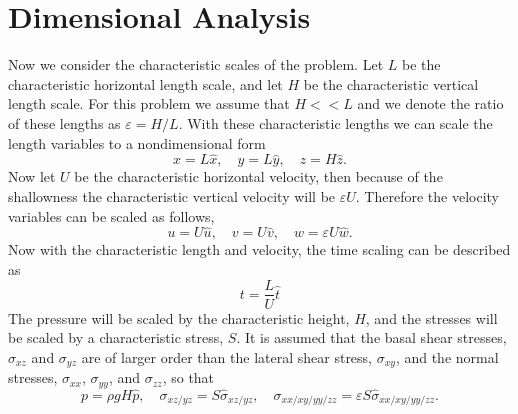 \documentclass[oneside]{article}
\begin{document}
  \section{Dimensional Analysis}
    Now we consider the characteristic scales of the problem.
    Let \(L\) be the characteristic horizontal length scale, and let \(H\) be the
    characteristic vertical length scale.
    For this problem we assume that \(H << L\) and we denote the ratio of these
    lengths as \(\varepsilon = H/L\).
    With these characteristic lengths we can scale the length variables to a
    nondimensional form
    \begin{equation}
      x = L\hat{x}, \quad y = L\hat{y}, \quad z = H\hat{z}.
    \end{equation}
    Now let \(U\) be the characteristic horizontal velocity, then because of the
    shallowness the characteristic vertical velocity will be \(\varepsilon U\).
    Therefore the velocity variables can be scaled as follows,
    \begin{equation}
      u = U\hat{u}, \quad v = U\hat{v}, \quad w = \varepsilon U \hat{w}.
    \end{equation}
    Now with the characteristic length and velocity, the time scaling can be described
    as
    \begin{equation}
      t = \frac{L}{U}\hat{t}
    \end{equation}
    The pressure will be scaled by the characteristic height, \(H\), and the stresses
    will be scaled by a characteristic stress, \(S\).
    It is assumed that the basal shear stresses, \(\sigma_{xz}\) and \(\sigma_{yz}\) are
     of larger order than the lateral shear stress, \(\sigma_{xy}\), and the normal
    stresses, \(\sigma_{xx}\), \(\sigma_{yy}\), and \(\sigma_{zz}\), so that
    \begin{equation}
      p = \rho g H \hat{p}, \quad \sigma_{xz/yz} = S\hat{\sigma}_{xz/yz}, \quad
      \sigma_{xx/xy/yy/zz} = \varepsilon S \hat{\sigma}_{xx/xy/yy/zz}.
    \end{equation}
\end{document}
